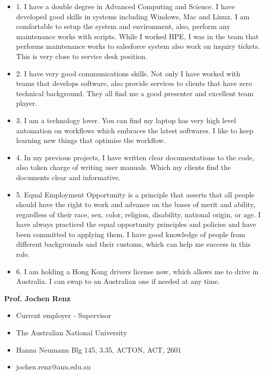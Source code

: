 \documentclass[11pt, a4paper]{awesome-cv}
\begin{document}
\begin{cvletter}
\begin{itemize}
\item 
1. I have a double degree in Advanced Computing and Science. I have developed good skills in systems including Windows, Mac and Linux. I am comfortable to setup the system and environment, also, perform any maintenance works with scripts. While I worked HPE, I was in the team that performs maintenance works to salesforce system also work on inquiry tickets. This is very close to service desk position.
\item 
2. I have very good communications skills. Not only I have worked with teams that develops software, also provide services to clients that have zero technical background. They all find me a good presenter and excellent team player.
\item 
3. I am a technology lover. You can find my laptop has very high level automation on workflows which embraces the latest softwares. I like to keep learning new things that optimise the workflow.
\item 
4. In my previous projects, I have written clear documentations to the code, also taken charge of writing user manuals. Which my clients find the documents clear and informative.
\item 
5. Equal Employment Opportunity is a principle that asserts that all people should have the right to work and advance on the bases of merit and ability, regardless of their race, sex, color, religion, disability, national origin, or age. I have always practiced the equal opportunity principles and policies and have been committed to applying them. I have good knowledge of people from different backgrounds and their customs, which can help me success in this role.
\item 
6. I am holding a Hong Kong drivers license now, which allows me to drive in Australia. I can swap to an Australian one if needed at any time.
\end{itemize}



\textbf{Prof. Jochen Renz}
\begin{itemize}
	\item Current employer ‑ Supervisor
	\item The Australian National University
	\item Hanna Neumann Blg 145, 3.35, ACTON, ACT, 2601
	\item jochen.renz@anu.edu.au
\end{itemize}


\end{cvletter}
\end{document}
